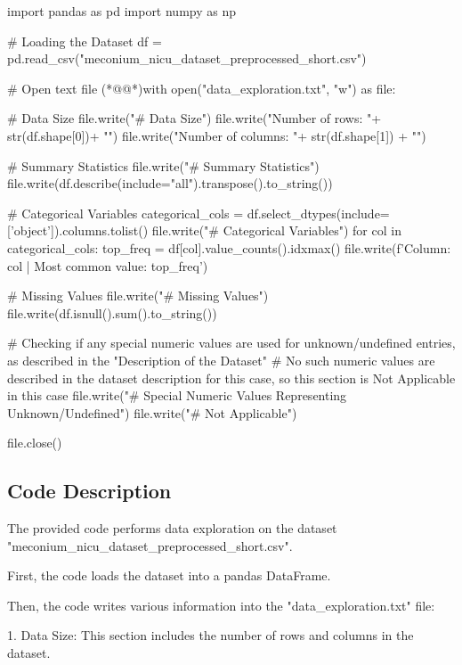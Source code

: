 \documentclass[11pt]{article}
\begin{document}
\begin{python}

import pandas as pd
import numpy as np

# Loading the Dataset
df = pd.read_csv("meconium_nicu_dataset_preprocessed_short.csv")

# Open text file
(*@@*)with open("data_exploration.txt", "w") as file:

    # Data Size
    file.write("# Data Size\n")
    file.write("Number of rows: "+ str(df.shape[0])+ "\n")
    file.write("Number of columns: "+ str(df.shape[1]) + "\n")
    
    # Summary Statistics
    file.write("\n# Summary Statistics\n")
    file.write(df.describe(include="all").transpose().to_string())

    # Categorical Variables
    categorical_cols = df.select_dtypes(include=['object']).columns.tolist()
    file.write("\n# Categorical Variables\n")
    for col in categorical_cols:
        top_freq = df[col].value_counts().idxmax()
        file.write(f'Column: {col} | Most common value: {top_freq}\n')

    # Missing Values
    file.write("\n# Missing Values\n")
    file.write(df.isnull().sum().to_string())

    # Checking if any special numeric values are used for unknown/undefined entries, as described in the "Description of the Dataset"
    # No such numeric values are described in the dataset description for this case, so this section is Not Applicable in this case
    file.write("\n# Special Numeric Values Representing Unknown/Undefined\n")
    file.write("# Not Applicable\n")

    file.close()

\end{python}

\subsection{Code Description}

The provided code performs data exploration on the dataset "meconium\_nicu\_dataset\_preprocessed\_short.csv". 

First, the code loads the dataset into a pandas DataFrame.

Then, the code writes various information into the "data\_exploration.txt" file:

1. Data Size: This section includes the number of rows and columns in the dataset.
\end{document}
